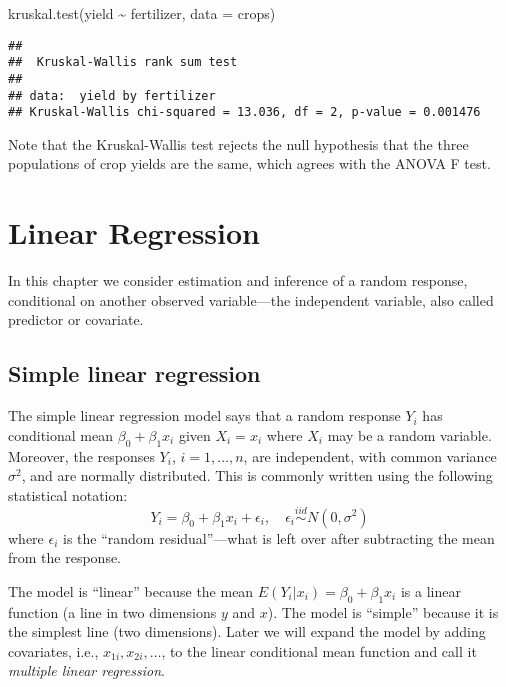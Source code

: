 \documentclass[
]{book}
\newenvironment{Shaded}{\begin{snugshade}}{\end{snugshade}}
\newcommand{\AttributeTok}[1]{\textcolor[rgb]{0.77,0.63,0.00}{#1}}
\newcommand{\FunctionTok}[1]{\textcolor[rgb]{0.00,0.00,0.00}{#1}}
\newcommand{\NormalTok}[1]{#1}
\newcommand{\SpecialCharTok}[1]{\textcolor[rgb]{0.00,0.00,0.00}{#1}}
\begin{document}
\begin{Shaded}
\begin{Highlighting}[]
\FunctionTok{kruskal.test}\NormalTok{(yield }\SpecialCharTok{\textasciitilde{}}\NormalTok{ fertilizer, }\AttributeTok{data =}\NormalTok{ crops)}
\end{Highlighting}
\end{Shaded}

\begin{verbatim}
## 
##  Kruskal-Wallis rank sum test
## 
## data:  yield by fertilizer
## Kruskal-Wallis chi-squared = 13.036, df = 2, p-value = 0.001476
\end{verbatim}

Note that the Kruskal-Wallis test rejects the null hypothesis that the three populations of crop yields are the same, which agrees with the ANOVA F test.

\hypertarget{linear-regression}{%
\chapter{Linear Regression}\label{linear-regression}}

In this chapter we consider estimation and inference of a random response, conditional on another observed variable---the independent variable, also called predictor or covariate.

\hypertarget{simple-linear-regression}{%
\section{Simple linear regression}\label{simple-linear-regression}}

The simple linear regression model says that a random response \(Y_i\) has conditional mean \(\beta_0 + \beta_1 x_i\) given \(X_i = x_i\) where \(X_i\) may be a random variable. Moreover, the responses \(Y_i\), \(i = 1, \ldots, n\), are independent, with common variance \(\sigma^2\), and are normally distributed. This is commonly written using the following statistical notation:
\[Y_i = \beta_0 + \beta_1 x_i + \epsilon_i, \quad \epsilon_i\stackrel{iid}{\sim} N(0, \sigma^2)\]
where \(\epsilon_i\) is the ``random residual''---what is left over after subtracting the mean from the response.

The model is ``linear'' because the mean \(E(Y_i|x_i) = \beta_0 + \beta_1 x_i\) is a linear function (a line in two dimensions \(y\) and \(x\)). The model is ``simple'' because it is the simplest line (two dimensions). Later we will expand the model by adding covariates, i.e., \(x_{1i}, x_{2i}, \ldots\), to the linear conditional mean function and call it \emph{multiple linear regression}.
\end{document}
